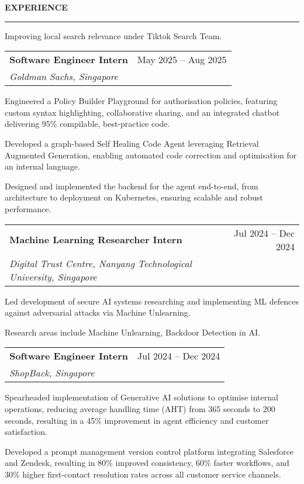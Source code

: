 \documentclass[11pt,letterpaper]{article}
\makeatletter
\newcommand{\resheading}[1]{%
  \vspace{2pt}
  {\normalsize \textbf{\MakeUppercase{#1}}}\\
  \vspace{-8pt}
  \hrule
}
\newcommand{\resitem}[1]{\item \small #1 \vspace{-2pt}}
\newcommand{\ressubheading}[4]{
    \vspace{2pt}
    \begin{tabular*}{\textwidth}{l@{\extracolsep{\fill}}r}
        \small \textbf{#1} & \small #2 \\
        \small \textit{#3} & \small \textit{#4} \\
    \end{tabular*}\vspace{-3pt}}
\makeatother
\begin{document}
\resheading{Experience}
\begin{leftitemize}
\item[]
\begin{subitemize}
    \resitem{Improving local search relevance under Tiktok Search Team.}
\end{subitemize}

\item[]
\ressubheading{Software Engineer Intern}{May 2025 -- Aug 2025}{Goldman Sachs, Singapore}{}
\begin{subitemize}
    \resitem{Engineered a Policy Builder Playground for authorisation policies, featuring custom syntax highlighting, collaborative sharing, and an integrated chatbot delivering 95\% compilable, best-practice code.}
    \resitem{Developed a graph-based Self Healing Code Agent leveraging Retrieval Augmented Generation, enabling automated code correction and optimisation for an internal language.}
    \resitem{Designed and implemented the backend for the agent end-to-end, from architecture to deployment on Kubernetes, ensuring scalable and robust performance.}
\end{subitemize}

\item[]
\ressubheading{Machine Learning Researcher Intern}{Jul 2024 -- Dec 2024}{Digital Trust Centre, Nanyang Technological University, Singapore}{}
\begin{subitemize}
    \resitem{Led development of secure AI systems researching and implementing ML defences against adversarial attacks via Machine Unlearning.}
    \resitem{Research areas include Machine Unlearning, Backdoor Detection in AI.}
\end{subitemize}

\item[]
\ressubheading{Software Engineer Intern}{Jul 2024 -- Dec 2024}{ShopBack, Singapore}{}
\begin{subitemize}
    \resitem{Spearheaded implementation of Generative AI solutions to optimise internal operations, reducing average handling time (AHT) from 365 seconds to 200 seconds, resulting in a 45\% improvement in agent efficiency and customer satisfaction.}
    \resitem{Developed a prompt management version control platform integrating Salesforce and Zendesk, resulting in 80\% improved consistency, 60\% faster workflows, and 30\% higher first-contact resolution rates across all customer service channels.}
\end{subitemize}


\end{leftitemize}
\end{document}
